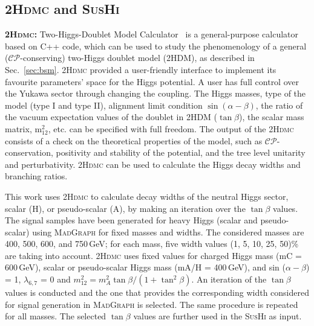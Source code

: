 \subsection{\textsc{2Hdmc} and \textsc{SusHi}}\label{subsec:sushi}
\textbf{\textsc{2Hdmc:}} Two-Higgs-Doublet Model Calculator~\cite{2hdmc} is a general-purpose calculator based on C++ code, which can be used to study the phenomenology of a general ($\mathcal{CP}$-conserving) two-Higgs doublet model (2HDM), as described in Sec.~\ref{sec:bsm}. \textsc{2Hdmc} provided a user-friendly interface to implement its favourite parameters’ space for the Higgs potential. A user has full control over the Yukawa sector through changing the coupling. The Higgs masses, type of the model (type I and type II), alignment limit condition $\sin (\alpha-\beta)$, the ratio of the vacuum expectation values of the doublet in 2HDM ($\tan\beta$), the scalar mass matrix, m$^{2}_{12}$, etc. can be specified with full freedom. The output of the \textsc{2Hdmc} consists of a check on the theoretical properties of the model, such as $\mathcal{CP}$-conservation, positivity and stability of the potential, and the tree level unitarity and perturbativity. \textsc{2Hdmc} can be used to calculate the Higgs decay widths and branching ratios.

This work uses \textsc{2Hdmc} to calculate decay widths of the neutral Higgs sector, scalar (H), or pseudo-scalar (A), by making an iteration over the $\tan\beta$ values. The signal samples have been generated for heavy Higgs (scalar and pseudo-scalar) using \textsc{MadGraph} for fixed masses and widths. The considered masses are 400, 500, 600, and 750\,GeV; for each mass, five width values (1, 5, 10, 25, 50)\% are taking into account. \textsc{2Hdmc} uses fixed values for charged Higgs mass (mC = 600\,GeV), scalar or pseudo-scalar Higgs mass (mA/H = 400\,GeV), and sin ($\alpha - \beta$) = 1, $\lambda_{6,7}$ = 0 and $m^{2}_{12} = m^{2}_{A}\tan\beta/(1 + \tan^{2}\beta)$. An iteration of the $\tan\beta$ values is conducted and the one that provides the corresponding width considered for signal generation in \textsc{MadGraph} is selected. The same procedure is repeated for all masses. The selected $\tan\beta$ values are further used in the \textsc{SusHi} as input.
   
